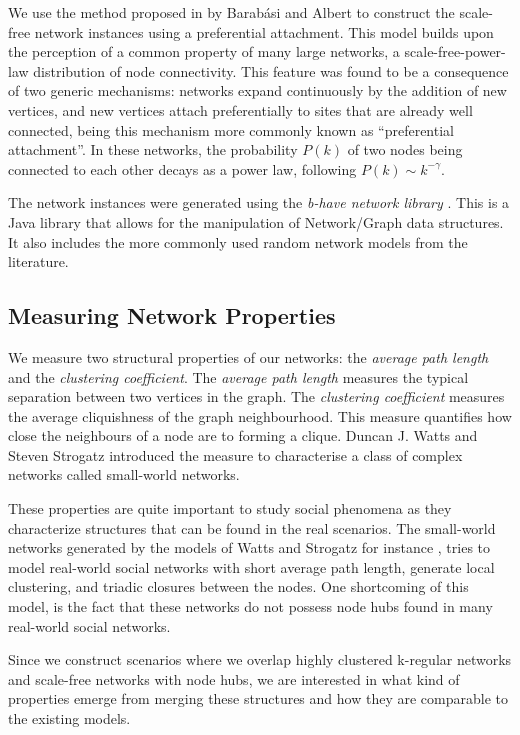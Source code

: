 \documentclass[preprint,number]{elsarticle}
\begin{document}
We use the method proposed in \cite{Barabasi1999} by Barab\'{a}si and Albert to construct the scale-free network instances using a preferential attachment. This model builds upon the perception of a common property of many large networks, a scale-free-power-law distribution of node connectivity. This feature was found to be a consequence of two generic mechanisms: networks expand continuously by the addition of new vertices, and new vertices attach preferentially to sites that are already well connected, being this mechanism more commonly known as ``preferential attachment''. In these networks, the probability $P(k)$ of two nodes being connected to each other decays as a power law, following $P(k) \sim k^{- \gamma}$.

The network instances were generated using the \textit{b-have network library} \cite{Nunes:Software:11069}. This is a Java library that allows for the manipulation of Network/Graph data structures. It also includes the more commonly used random network models from the literature. 

\subsection{Measuring Network Properties}
\noindent We measure two structural properties of our networks: the \textit{average path length} and the \textit{clustering coefficient}. The \textit{average path length} measures the typical separation between two vertices in the graph. The \textit{clustering coefficient} measures the average cliquishness of the graph neighbourhood. This measure quantifies how close the neighbours of a node are to forming a clique. Duncan J. Watts and Steven Strogatz \cite{Watts1998} introduced the measure to characterise a class of complex networks called small-world networks. 

These properties are quite important to study social phenomena as they characterize structures that 
can be found in the real scenarios. The small-world networks generated by the models of Watts and Strogatz for instance \cite{Watts1998}, tries to model real-world social networks with short average path length, generate local clustering, and triadic closures between the nodes. One shortcoming of this model, is the fact that these networks do not possess node hubs found in many real-world social networks.

Since we construct scenarios where we overlap highly clustered k-regular networks and scale-free networks with node hubs, we are interested in what kind of properties emerge from merging these structures and how they are comparable to the existing models. 
\end{document}
